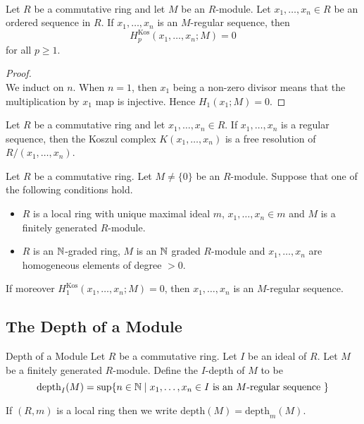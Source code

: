 \documentclass[a4paper]{article}
\begin{document}
\begin{prp}{}{}\\
Let $R$ be a commutative ring and let $M$ be an $R$-module. Let $x_1,\dots,x_n\in R$ be an ordered sequence in $R$. If $x_1,\dots,x_n$ is an $M$-regular sequence, then $$H_p^\text{Kos}(x_1,\dots,x_n;M)=0$$ for all $p\geq 1$. 
\begin{proof}\\
We induct on $n$. When $n=1$, then $x_1$ being a non-zero divisor means that the multiplication by $x_1$ map is injective. Hence $H_1(x_1;M)=0$. 
\end{proof}
\end{prp}

\begin{crl}{}{} Let $R$ be a commutative ring and let $x_1,\dots,x_n\in R$. If $x_1,\dots,x_n$ is a regular sequence, then the Koszul complex $K(x_1,\dots,x_n)$ is a free resolution of $R/(x_1,\dots,x_n)$. 
\end{crl}

\begin{prp}{}{} Let $R$ be a commutative ring. Let $M\neq\{0\}$ be an $R$-module. Suppose that one of the following conditions hold. 
\begin{itemize}
\item $R$ is a local ring with unique maximal ideal $m$, $x_1,\dots,x_n\in m$ and $M$ is a finitely generated $R$-module. 
\item $R$ is an $\mathbb{N}$-graded ring, $M$ is an $\mathbb{N}$ graded $R$-module and $x_1,\dots,x_n$ are homogeneous elements of degree $>0$. 
\end{itemize}
If moreover $H_1^\text{Kos}(x_1,\dots,x_n;M)=0$, then $x_1,\dots,x_n$ is an $M$-regular sequence. 
\end{prp}

\subsection{The Depth of a Module}
\begin{defn}{Depth of a Module}{} Let $R$ be a commutative ring. Let $I$ be an ideal of $R$. Let $M$ be a finitely generated $R$-module. Define the $I$-depth of $M$ to be $$\text{depth}_I(M)=\sup\{n\in\mathbb{N}\;|\;x_1,\dots,x_n\in I\text{ is an }M\text{-regular sequence }\}$$
\end{defn}

If $(R,m)$ is a local ring then we write $\text{depth}(M)=\text{depth}_m(M)$. 
\end{document}
